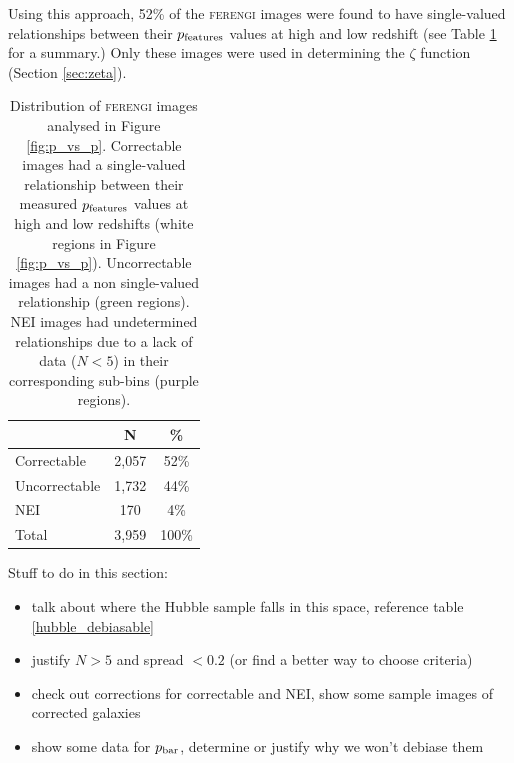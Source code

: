 \documentclass[usenatbib]{mn2e}
\newcommand{\ferengi}{\textsc{ferengi}}
\newcommand{\pbar}{p_{\rm bar}}
\begin{document}
Using this approach, 52\% of the \ferengi{} images were found to have single-valued relationships between their $p_{\rm features}$ values at high and low redshift (see Table \ref{ferengi_corrections} for a summary.) Only these images were used in determining the $\zeta$ function (Section \ref{sec:zeta}).  


\begin{table}
\caption{Distribution of \ferengi{} images analysed in Figure \ref{fig:p_vs_p}. Correctable images had a single-valued relationship between their measured $p_{\rm features}$ values at high and low redshifts (white regions in Figure \ref{fig:p_vs_p}). Uncorrectable images had a non single-valued relationship (green regions). NEI images had undetermined relationships due to a lack of data ($N<5$) in their corresponding sub-bins (purple regions).   \label{ferengi_corrections}}
\begin{tabular}{lcc}
\hline \hline
				   & N     & \% \\
\hline 
Correctable                        & 2,057   & 52\% \\
Uncorrectable                      & 1,732   & 44\% \\
NEI                                & 170     &  4\%\\
Total                              & 3,959   & 100\% \\
\hline \hline
\end{tabular}
\end{table}


Stuff to do in this section: 

\begin{itemize}
\item talk about where the Hubble sample falls in this space, reference table \ref{hubble_debiasable} 
\item justify $N>5$ and spread $< 0.2$ (or find a better way to choose criteria)
\item check out corrections for correctable and NEI, show some sample images of corrected galaxies
\item show some data for $\pbar$, determine or justify why we won't debiase them  
\end{itemize}
\end{document}
